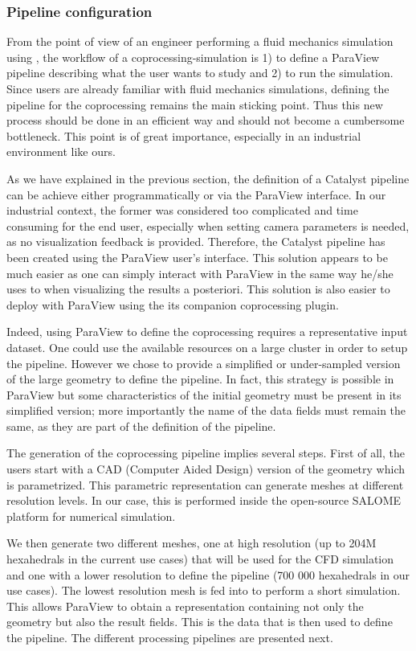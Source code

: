 \subsubsection{Pipeline configuration}
\label{sec:pip_conf_tools}

From the point of view of an engineer performing a fluid mechanics simulation
using \CS, the workflow of a coprocessing-simulation is 1) to define
a ParaView pipeline describing what the user wants to study and 2) to run the
simulation. Since users are already familiar with fluid mechanics
simulations, defining the pipeline for the coprocessing remains the main
sticking point. Thus this new process should be done in an efficient way and 
should not become a cumbersome bottleneck. This point is of great importance, especially in
an industrial environment like ours.

As we have explained in the previous section, the definition of a Catalyst pipeline can be achieve either 
programmatically or via the ParaView interface. In our industrial context, the former 
was considered too complicated and time consuming for the end user, especially when setting camera
parameters is needed, as no visualization feedback is provided. Therefore, the Catalyst pipeline has 
been created using the ParaView user's interface. This solution appears to be much easier as one
can simply interact with ParaView in the same way he/she uses to when
visualizing the results a posteriori. This solution is also easier to deploy with ParaView using the 
its companion coprocessing plugin. 

Indeed, using ParaView to define the coprocessing requires a representative input dataset.
One could use the available resources on a large cluster in order to setup the pipeline. However we chose to  
provide a simplified or under-sampled version of the large geometry to define the
pipeline. In fact, this strategy is possible in ParaView but some
characteristics of the initial geometry must be present in its simplified version; more importantly the name of the data fields must
remain the same, as they are part of the definition of the pipeline.

The generation of the coprocessing pipeline implies several steps.
First of all, the users start with a CAD (Computer Aided Design)
version of the geometry which is parametrized. This parametric representation
can generate meshes at different resolution levels. In our case, this is
performed inside the open-source SALOME~\cite{4291178} platform for numerical simulation. 

We then generate two different meshes, one at high resolution (up to 204M
hexahedrals in the current use cases) that will be used for the CFD
simulation and one with a lower resolution to define the pipeline (700 000
hexahedrals in our use cases). The lowest resolution mesh is fed into \CS to perform a short
simulation. This allows ParaView to obtain a representation containing not
only the geometry but also the result fields. This is the data that is then used to define the pipeline.
The different processing pipelines are presented next.
